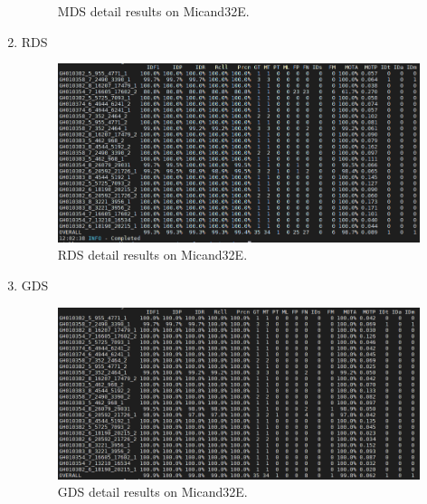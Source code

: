\begin{enumerate}
\begin{figure}
			\caption{MDS detail results on Micand32E.}
		\end{figure}
	\item RDS
		\begin{figure}
			\centerline{\includegraphics[width=1\linewidth]{Figs/Evaluation/micand26/rds.png}}
			\caption{RDS detail results on Micand32E.}
		\end{figure}
	\item GDS
		\begin{figure}
			\centerline{\includegraphics[width=1\linewidth]{Figs/Evaluation/micand26/gds.png}}
			\caption{GDS detail results on Micand32E.}
		\end{figure}
\end{enumerate}
